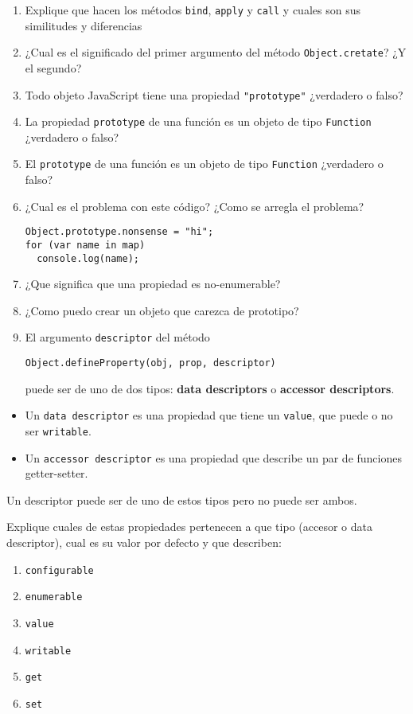 \begin{enumerate}
\def\labelenumi{\arabic{enumi}.}
\setcounter{enumi}{5}
\item
  Explique que hacen los métodos \texttt{bind}, \texttt{apply} y
  \texttt{call} y cuales son sus similitudes y diferencias
\item
  ¿Cual es el significado del primer argumento del método
  \texttt{Object.cretate}? ¿Y el segundo?
\item
  Todo objeto JavaScript tiene una propiedad \texttt{"prototype"}
  ¿verdadero o falso?
\item
  La propiedad \texttt{prototype} de una función es un objeto de tipo
  \texttt{Function} ¿verdadero o falso?
\item
  El \texttt{prototype} de una función es un objeto de tipo
  \texttt{Function} ¿verdadero o falso?
\item
  ¿Cual es el problema con este código? ¿Como se arregla el problema?

\begin{verbatim}
Object.prototype.nonsense = "hi";
for (var name in map)
  console.log(name);
\end{verbatim}
\item
  ¿Que significa que una propiedad es no-enumerable? 
\item
  ¿Como puedo crear un objeto que carezca de prototipo? 
\item
  El argumento \texttt{descriptor} del método

\begin{verbatim}
Object.defineProperty(obj, prop, descriptor)
\end{verbatim}

  puede ser de uno de dos tipos: \textbf{data descriptors} o
  \textbf{accessor descriptors}.
\end{enumerate}

\begin{itemize}
\itemsep1pt\parskip0pt
\item
  Un \texttt{data descriptor} es una propiedad que tiene un
  \texttt{value}, que puede o no ser \texttt{writable}.
\item
  Un \texttt{accessor descriptor} es una propiedad que describe un par
  de funciones getter-setter.
\end{itemize}

Un descriptor puede ser de uno de estos tipos pero no puede ser ambos.

Explique cuales de estas propiedades pertenecen a que tipo (accesor o
data descriptor), cual es su valor por defecto y que describen:

\begin{enumerate}
\def\labelenumi{\arabic{enumi}.}
\itemsep1pt\parskip0pt
\item
  \texttt{configurable} 
\item
  \texttt{enumerable} 
\item
  \texttt{value} 
\item
  \texttt{writable} 
\item
  \texttt{get} 
\item
  \texttt{set} 
\end{enumerate}
